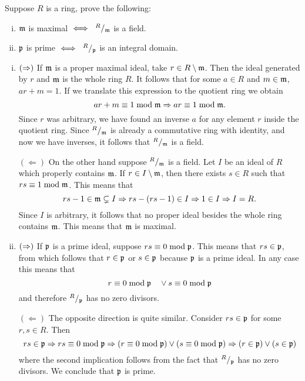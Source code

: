 \documentclass[12pt]{memoir}
\begin{document}
\begin{Ej}[2.1.2]
  Suppose $R$ is a ring, prove the following:
  \vspace{-0.4em}
  \begin{enumerate}[i)]
    \itemsep=-0.4em
    \item $\mathfrak{m}$ is maximal $\iff\ \quot{R}{\lie m}$ is a field. 
    \item $\mathfrak{p}$ is prime $\iff\ \quot{R}{\lie p}$ is an integral domain. 
  \end{enumerate}
\end{Ej}
\begin{ptcbr}
  \begin{enumerate}[i)]
    \itemsep=-0.4em
    \item $(\Rightarrow)$ If $\mathfrak{m}$ is a proper maximal ideal, take $r\in R\setminus\mathfrak{m}$. Then the ideal generated by $r$ and $\mathfrak{m}$ is the whole ring $R$. It follows that for some $a\in R$ and $m\in\mathfrak{m}$, $ar+m=1$. If we translate this expression to the quotient ring we obtain
    $$ar+m\equiv 1\bmod \mathfrak{m}\Rightarrow ar\equiv 1\bmod\mathfrak{m}.$$ %
    Since $r$ was arbitrary, we have found an inverse $a$ for any element $r$ inside the quotient ring. Since $\quot{R}{\lie m}$ is already a commutative ring with identity, and now we have inverses, it follows that $\quot{R}{\lie m}$ is a field.\par 
    $(\Leftarrow)$ On the other hand suppose $\quot{R}{\lie m}$ is a field. Let $I$ be an ideal of $R$ which properly contains $\mathfrak{m}$. If $r\in I\setminus\mathfrak{m}$, then there exists $s\in R$ such that $rs\equiv 1\bmod\mathfrak{m}$. This means that 
    $$rs-1\in\mathfrak{m}\subsetneq I\Rightarrow rs-(rs-1)\in I\Rightarrow 1\in I\Rightarrow I=R.$$
    Since $I$ is arbitrary, it follows that no proper ideal besides the whole ring contains $\mathfrak{m}$. This means that $\mathfrak{m}$ is maximal.
    \item $(\Rightarrow)$ If $\mathfrak{p}$ is a prime ideal, suppose $rs\equiv 0\bmod\mathfrak{p}$. This means that $rs\in\mathfrak{p}$, from which follows that $r\in\mathfrak{p}$ or $s\in\mathfrak{p}$ because $\mathfrak{p}$ is a prime ideal. In any case this means that
    $$r\equiv 0\bmod\mathfrak{p}\quad\lor s\equiv 0\bmod\mathfrak{p}$$
    and therefore $\quot{R}{\lie p}$ has no zero divisors.\par
    $(\Leftarrow)$ The opposite direction is quite similar. Consider $rs\in\mathfrak{p}$ for some $r,s\in R$. Then 
    $$rs\in\mathfrak{p}\Rightarrow rs\equiv 0\bmod\mathfrak{p}\Rightarrow (r\equiv 0\bmod\mathfrak{p})\lor(s\equiv 0\bmod\mathfrak{p})\Rightarrow(r\in\mathfrak{p})\lor(s\in\mathfrak{p})$$
    where the second implication follows from the fact that $\quot{R}{\lie p}$ has no zero divisors. We conclude that $\mathfrak{p}$ is prime.
  \end{enumerate}
\end{ptcbr}
\end{document}
